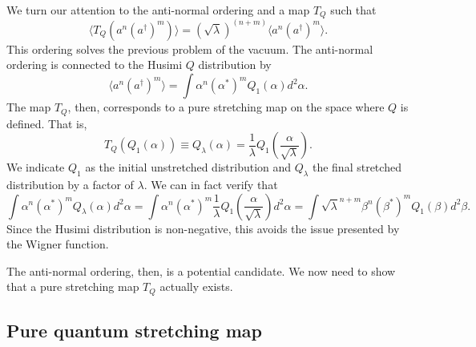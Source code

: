 \documentclass{SciPost}
\begin{document}
We turn our attention to the anti-normal ordering and a map $T_Q$ such that
\begin{equation}
	\langle T_Q(a^n(a^\dagger)^m) \rangle = (\sqrt{\lambda})^{(n+m)} \langle a^n(a^\dagger)^m \rangle.
\end{equation}
This ordering solves the previous problem of the vacuum. The anti-normal ordering is connected to the Husimi $Q$ distribution by
\begin{equation}
	\langle a^n (a^\dagger)^m\rangle=\int \alpha^n(\alpha^*)^m Q_1(\alpha)d^2\alpha.
\end{equation}
The map $T_Q$, then, corresponds to a pure stretching map on the space where $Q$ is defined. That is,
\begin{equation}
	T_Q(Q_1(\alpha)) \equiv Q_\lambda(\alpha) = \frac{1}{\lambda}Q_1\left(\frac{\alpha}{\sqrt{\lambda}}\right).
\end{equation}
We indicate $Q_1$ as the initial unstretched distribution and $Q_\lambda$ the final stretched distribution by a factor of $\lambda$. We can in fact verify that 
\begin{equation}
	\int \alpha^n(\alpha^*)^m Q_\lambda(\alpha)d^2\alpha=\int \alpha^n(\alpha^*)^m \frac{1}{\lambda}Q_1\left(\frac{\alpha}{\sqrt{\lambda}}\right)d^2\alpha=\int \sqrt{\lambda}^{n+m}\beta^n(\beta^*)^m Q_1(\beta)d^2\beta.
\end{equation}
Since the Husimi distribution is non-negative, this avoids the issue presented by the Wigner function.

The anti-normal ordering, then, is a potential candidate. We now need to show that a pure stretching map $T_Q$ actually exists.

\subsection{Pure quantum stretching map}
\end{document}
